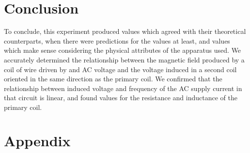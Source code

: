\documentclass[12pt]{article}
\numberwithin{equation}{section}
\numberwithin{figure}{section}
\numberwithin{table}{section}
\begin{document}
    \section{Conclusion}
    To conclude, this experiment produced values which agreed with their theoretical 
    counterparts, when there were predictions for the values at least, and values which 
    make sense considering the physical attributes of the apparatus used. We accurately 
    determined the relationship between the magnetic field produced by a coil of wire 
    driven by and AC voltage and the voltage induced in a second coil oriented in the same 
    direction as the primary coil. We confirmed that the relationship between induced voltage 
    and frequency of the AC supply current in that circuit is linear, and found values for 
    the resistance and inductance of the primary coil. 

    \newpage
    \section{Appendix}
    \setcounter{figure}{0} \renewcommand{\thefigure}{A.\arabic{figure}}
    
    
    
    
\end{document}
